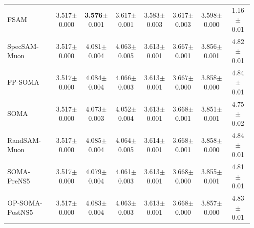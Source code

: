 \begin{table}[t]
{\begin{tabular}{lccccccc}
    FSAM & 3.517{\scriptsize$\pm$0.000} & \textbf{3.576}{\scriptsize$\pm$0.001} & 3.617{\scriptsize$\pm$0.001} & 3.583{\scriptsize$\pm$0.003} & 3.617{\scriptsize$\pm$0.003} & 3.598{\scriptsize$\pm$0.000} & 1.16{\scriptsize$\pm$0.01} \\
    SpecSAM-Muon & 3.517{\scriptsize$\pm$0.000} & 4.081{\scriptsize$\pm$0.004} & 4.063{\scriptsize$\pm$0.005} & 3.613{\scriptsize$\pm$0.001} & 3.667{\scriptsize$\pm$0.001} & 3.856{\scriptsize$\pm$0.001} & 4.82{\scriptsize$\pm$0.01} \\
    FP-SOMA & 3.517{\scriptsize$\pm$0.000} & 4.084{\scriptsize$\pm$0.004} & 4.066{\scriptsize$\pm$0.003} & 3.613{\scriptsize$\pm$0.001} & 3.667{\scriptsize$\pm$0.000} & 3.858{\scriptsize$\pm$0.000} & 4.84{\scriptsize$\pm$0.01} \\
    SOMA & 3.517{\scriptsize$\pm$0.000} & 4.073{\scriptsize$\pm$0.003} & 4.052{\scriptsize$\pm$0.004} & 3.613{\scriptsize$\pm$0.001} & 3.668{\scriptsize$\pm$0.001} & 3.851{\scriptsize$\pm$0.001} & 4.75{\scriptsize$\pm$0.02} \\
    RandSAM-Muon & 3.517{\scriptsize$\pm$0.000} & 4.085{\scriptsize$\pm$0.004} & 4.064{\scriptsize$\pm$0.005} & 3.614{\scriptsize$\pm$0.001} & 3.668{\scriptsize$\pm$0.001} & 3.858{\scriptsize$\pm$0.000} & 4.84{\scriptsize$\pm$0.01} \\
    SOMA-PreNS5 & 3.517{\scriptsize$\pm$0.000} & 4.079{\scriptsize$\pm$0.004} & 4.061{\scriptsize$\pm$0.003} & 3.613{\scriptsize$\pm$0.001} & 3.668{\scriptsize$\pm$0.000} & 3.855{\scriptsize$\pm$0.001} & 4.81{\scriptsize$\pm$0.01} \\
    OP-SOMA-PostNS5 & 3.517{\scriptsize$\pm$0.000} & 4.083{\scriptsize$\pm$0.004} & 4.063{\scriptsize$\pm$0.003} & 3.613{\scriptsize$\pm$0.001} & 3.668{\scriptsize$\pm$0.000} & 3.857{\scriptsize$\pm$0.000} & 4.83{\scriptsize$\pm$0.01} \\
    \bottomrule
  \end{tabular}}
\end{table}

